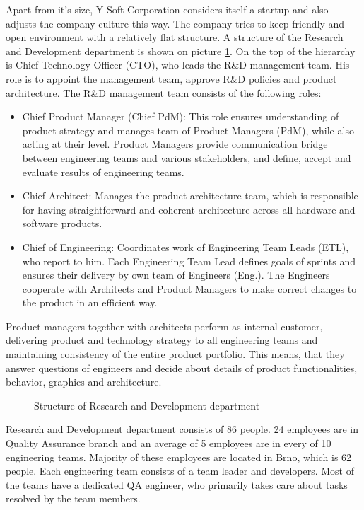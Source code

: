 \documentclass[11pt,singleside]{myfithesis2}
\newcommand{\pict}[4]{
	\begin{figure}[h!]
  		\vspace{-7px}
  		\centerline{\fcolorbox{darkgray}{palegray}{\texttt{[image: \#2]}}}
  		\caption{#1}
  		\label{#4}
	\end{figure}
}
\begin{document}
Apart from it's size, Y Soft Corporation considers itself a startup and also adjusts the company culture this way. The company tries to keep friendly and open environment with a relatively flat structure. A structure of the Research and Development department is shown on picture \ref{pic:rndStructure}. On the top of the hierarchy is Chief Technology Officer (CTO), who leads the R\&D management team. His role is to appoint the management team, approve R\&D policies and product architecture. The R\&D management team consists of the following roles:
\begin{itemize}
	\item{Chief Product Manager (Chief PdM):} This role ensures understanding of product strategy and manages team of Product Managers (PdM), while also acting at their level. Product Managers provide communication bridge between engineering teams and various stakeholders, and define, accept and evaluate results of engineering teams.
	\item{Chief Architect:} Manages the product architecture team, which is responsible for having straightforward and coherent architecture across all hardware and software products.  
	\item{Chief of Engineering:} Coordinates work of Engineering Team Leads (ETL), who report to him. Each Engineering Team Lead defines goals of sprints and ensures their delivery by own team of Engineers (Eng.). The Engineers cooperate with Architects and Product Managers to make correct changes to the product in an efficient way.
\end{itemize}
Product managers together with architects perform as internal customer, delivering product and technology strategy to all engineering teams and maintaining consistency of the entire product portfolio. This means, that they answer questions of engineers and decide about details of product functionalities, behavior, graphics and architecture. 

\pict{Structure of Research and Development department}{data/rndStructure.png}{width=1\textwidth}{pic:rndStructure}

Research and Development department consists of 86 people. 24 employees are in Quality Assurance branch and an average of 5 employees are in every of 10 engineering teams. Majority of these employees are located in Brno, which is 62 people. Each engineering team consists of a team leader and developers. Most of the teams have a dedicated QA engineer, who primarily takes care about tasks resolved by the team members.
\end{document}

